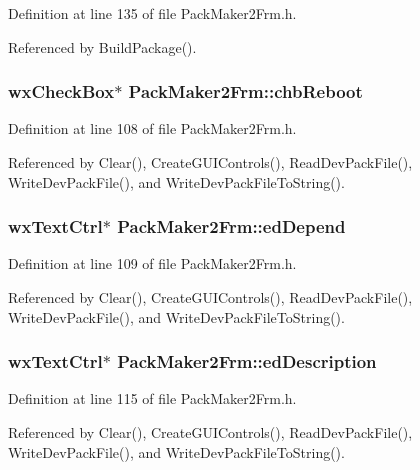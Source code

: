 Definition at line 135 of file Pack\-Maker2Frm.h.

Referenced by Build\-Package().
\subsubsection{\setlength{\rightskip}{0pt plus 5cm}wx\-Check\-Box$\ast$ {\bf Pack\-Maker2Frm::chb\-Reboot}\hspace{0.3cm}{\tt  [private]}}\label{class_pack_maker2_frm_2ba842a0b8812611952e879163b6f779}




Definition at line 108 of file Pack\-Maker2Frm.h.

Referenced by Clear(), Create\-GUIControls(), Read\-Dev\-Pack\-File(), Write\-Dev\-Pack\-File(), and Write\-Dev\-Pack\-File\-To\-String().
\subsubsection{\setlength{\rightskip}{0pt plus 5cm}wx\-Text\-Ctrl$\ast$ {\bf Pack\-Maker2Frm::ed\-Depend}\hspace{0.3cm}{\tt  [private]}}\label{class_pack_maker2_frm_24044118f2a47ace5b31a445f4d17955}




Definition at line 109 of file Pack\-Maker2Frm.h.

Referenced by Clear(), Create\-GUIControls(), Read\-Dev\-Pack\-File(), Write\-Dev\-Pack\-File(), and Write\-Dev\-Pack\-File\-To\-String().
\subsubsection{\setlength{\rightskip}{0pt plus 5cm}wx\-Text\-Ctrl$\ast$ {\bf Pack\-Maker2Frm::ed\-Description}\hspace{0.3cm}{\tt  [private]}}\label{class_pack_maker2_frm_f991dd8d5bfc15fb787b76ead162c2f6}




Definition at line 115 of file Pack\-Maker2Frm.h.

Referenced by Clear(), Create\-GUIControls(), Read\-Dev\-Pack\-File(), Write\-Dev\-Pack\-File(), and Write\-Dev\-Pack\-File\-To\-String().
